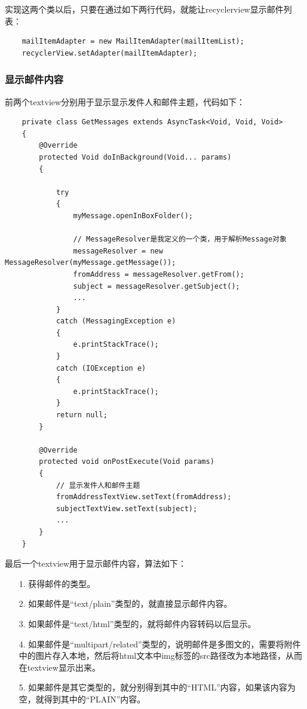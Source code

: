 \documentclass[a4paper,left=2.5cm,right=2.5cm,11pt]{article}
\begin{document}
	实现这两个类以后，只要在通过如下两行代码，就能让recyclerview显示邮件列表：
	\begin{lstlisting}
	mailItemAdapter = new MailItemAdapter(mailItemList);
	recyclerView.setAdapter(mailItemAdapter);
	\end{lstlisting}

\subsubsection{显示邮件内容}
	前两个textview分别用于显示显示发件人和邮件主题，代码如下：
	\begin{lstlisting}
	private class GetMessages extends AsyncTask<Void, Void, Void>
    {
        @Override
        protected Void doInBackground(Void... params)
        {

            try
            {
                myMessage.openInBoxFolder();
				
				// MessageResolver是我定义的一个类，用于解析Message对象
                messageResolver = new MessageResolver(myMessage.getMessage());
                fromAddress = messageResolver.getFrom();
                subject = messageResolver.getSubject();
                ...
            }
            catch (MessagingException e)
            {
                e.printStackTrace();
            }
            catch (IOException e)
            {
                e.printStackTrace();
            }
            return null;
        }

        @Override
        protected void onPostExecute(Void params)
        {
			// 显示发件人和邮件主题
            fromAddressTextView.setText(fromAddress);
            subjectTextView.setText(subject);
			...
        }
    }
	\end{lstlisting}

	最后一个textview用于显示邮件内容，算法如下：
	\begin{itemize}
		\item[1.] 获得邮件的类型。
		\item[2.] 如果邮件是“text/plain”类型的，就直接显示邮件内容。
		\item[3.] 如果邮件是“text/html”类型的，就将邮件内容转码以后显示。
		\item[4.] 如果邮件是“multipart/related”类型的，说明邮件是多图文的，需要将附件中的图片存入本地，然后将html文本中img标签的src路径改为本地路径，从而在textview显示出来。
		\item[5.] 如果邮件是其它类型的，就分别得到其中的“HTML”内容，如果该内容为空，就得到其中的“PLAIN”内容。
	\end{itemize}
\end{document}
